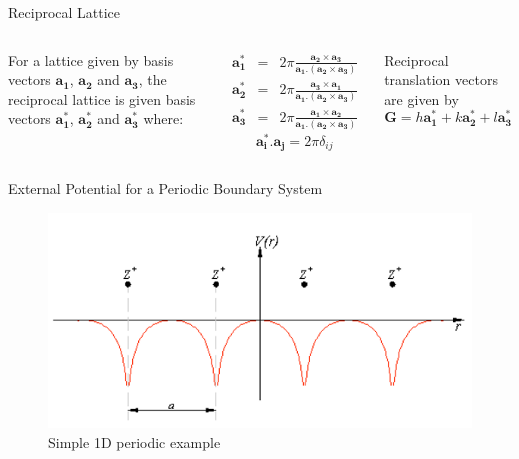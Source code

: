 \documentclass[aspectratio=169]{beamer}
\let \vec \mathbf
\begin{document}
\begin{frame}{Reciprocal Lattice}

\begin{columns}
For a lattice given by basis vectors $\vec{a_1}$, $\vec{a_2}$ and $\vec{a_3}$, the reciprocal lattice is given basis vectors $\vec{a_1^*}$, $\vec{a_2^*}$ and $\vec{a_3^*}$ where:

\begin{eqnarray*}
    \vec{a_1^*} & = & 2\pi\frac{\vec{a_2} \times \vec{a_3}}{\vec{a_1}.(\vec{a_2} \times \vec{a_3})}\\
    \vec{a_2^*} & = & 2\pi\frac{\vec{a_3} \times \vec{a_1}}{\vec{a_1}.(\vec{a_2} \times \vec{a_3})}\\
    \vec{a_3^*} & = & 2\pi\frac{\vec{a_1} \times \vec{a_2}}{\vec{a_1}.(\vec{a_2} \times \vec{a_3})}
\end{eqnarray*}
\begin{equation*}
    \vec{a_i^*}.\vec{a_j} = 2\pi \delta_{ij}
\end{equation*}

Reciprocal translation vectors are given by
\begin{equation*}
    \vec{G} = h\vec{a_1^*} + k\vec{a_2^*} + l\vec{a_3^*}
\end{equation*}
\end{columns} 

\end{frame}

\begin{frame}{External Potential for a Periodic Boundary System}

\begin{figure}
    \centering
    \includegraphics[width=0.8\linewidth]{lectures/figures/7_periodic_potential.png}
    \caption{Simple 1D periodic example}
\end{figure}

\end{frame}
\end{document}
